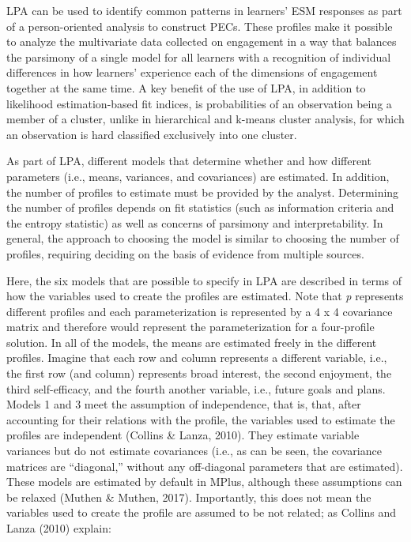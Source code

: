 \documentclass[]{book}
\theoremstyle{definition}
\theoremstyle{definition}
\theoremstyle{definition}
\theoremstyle{remark}
\begin{document}
LPA can be used to identify common patterns in learners' ESM responses
as part of a person-oriented analysis to construct PECs. These profiles
make it possible to analyze the multivariate data collected on
engagement in a way that balances the parsimony of a single model for
all learners with a recognition of individual differences in how
learners' experience each of the dimensions of engagement together at
the same time. A key benefit of the use of LPA, in addition to
likelihood estimation-based fit indices, is probabilities of an
observation being a member of a cluster, unlike in hierarchical and
k-means cluster analysis, for which an observation is hard classified
exclusively into one cluster.

As part of LPA, different models that determine whether and how
different parameters (i.e., means, variances, and covariances) are
estimated. In addition, the number of profiles to estimate must be
provided by the analyst. Determining the number of profiles depends on
fit statistics (such as information criteria and the entropy statistic)
as well as concerns of parsimony and interpretability. In general, the
approach to choosing the model is similar to choosing the number of
profiles, requiring deciding on the basis of evidence from multiple
sources.

Here, the six models that are possible to specify in LPA are described
in terms of how the variables used to create the profiles are estimated.
Note that \emph{p} represents different profiles and each
parameterization is represented by a 4 x 4 covariance matrix and
therefore would represent the parameterization for a four-profile
solution. In all of the models, the means are estimated freely in the
different profiles. Imagine that each row and column represents a
different variable, i.e., the first row (and column) represents broad
interest, the second enjoyment, the third self-efficacy, and the fourth
another variable, i.e., future goals and plans. Models 1 and 3 meet the
assumption of independence, that is, that, after accounting for their
relations with the profile, the variables used to estimate the profiles
are independent (Collins \& Lanza, 2010). They estimate variable
variances but do not estimate covariances (i.e., as can be seen, the
covariance matrices are ``diagonal,'' without any off-diagonal
parameters that are estimated). These models are estimated by default in
MPlus, although these assumptions can be relaxed (Muthen \& Muthen,
2017). Importantly, this does not mean the variables used to create the
profile are assumed to be not related; as Collins and Lanza (2010)
explain:
\end{document}
